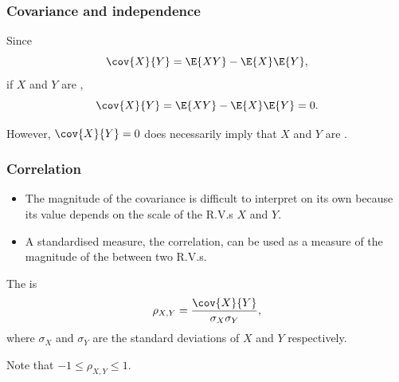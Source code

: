 \documentclass[compress]{beamer}\usepackage[]{graphicx}\usepackage[]{xcolor}
\begin{document}
\begin{frame}[fragile]
  \frametitle{Covariance and independence}
    Since
      \[ \cov{X}{Y} = \E{XY} - \E{X}\E{Y}, \]
    if $X$ and $Y$ are ,
      \[ \cov{X}{Y} = \E{XY} - \E{X}\E{Y} = 0. \]

    However, $\cov{X}{Y} = 0$ does  necessarily imply that $X$ and $Y$ are .
\end{frame}


\begin{frame}[fragile]
  \frametitle{Correlation}
    \begin{itemize}
      \item The magnitude of the covariance is difficult to interpret on its own because its value depends on the scale of the R.V.s $X$ and $Y$.
      \item A standardised measure, the correlation, can be used as a measure of the magnitude of the  between two R.V.s.
    \end{itemize}

    The  is
      \[ \rho_{X,Y}=\frac{\cov{X}{Y}}{\sigma_X\sigma_Y}, \]
    where $\sigma_X$ and $\sigma_Y$ are the standard deviations of $X$ and $Y$ respectively.

    Note that $-1 \leq \rho_{X,Y} \leq 1$.
\end{frame}
\end{document}
